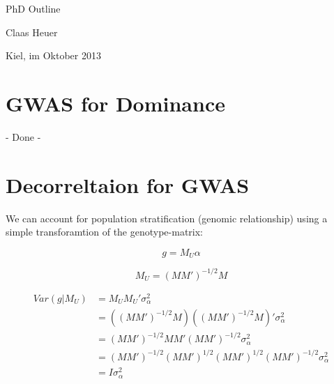 \documentclass[a4paper,DIVcalc,12pt,liststotoc,bibtotoc,headsepline,plainheadsepline]{scrartcl}
\begin{document}
\begin{titlepage}



\vspace{30pt}


\vspace{30pt}

\begin{center}
\huge{
PhD Outline}
\end{center}

\vspace{30pt}


\vspace{30pt}


\vspace{50pt}
\begin{center}
\large
Claas Heuer
\end{center}

\vspace{50pt}
\begin{center}
Kiel, im Oktober 2013
\end{center}




\end{titlepage}
\clearpage


\clearpage
{}






\thispagestyle{sectionstyle}
\section{GWAS for Dominance}

- Done -

\section{Decorreltaion for GWAS}
We can account for population stratification (genomic relationship) using a simple transforamtion of the genotype-matrix:

\begin{equation*}
g = M_{U}\alpha
\end{equation*}

\begin{equation*}
M_{U} = (MM')^{-1/2}M
\end{equation*} 


\begin{align*}
Var(g|M_{U}) &= M_{U}M_{U}'\sigma_{\alpha}^2 \\
&= ((MM')^{-1/2}M)((MM')^{-1/2}M)'\sigma_{\alpha}^2  \\
&= (MM')^{-1/2}MM'(MM')^{-1/2}\sigma_{\alpha}^2 \\
&= (MM')^{-1/2}(MM')^{1/2}(MM')^{1/2}(MM')^{-1/2}\sigma_{\alpha}^2 \\
&= I\sigma_{\alpha}^2
\end{align*}
\end{document}
